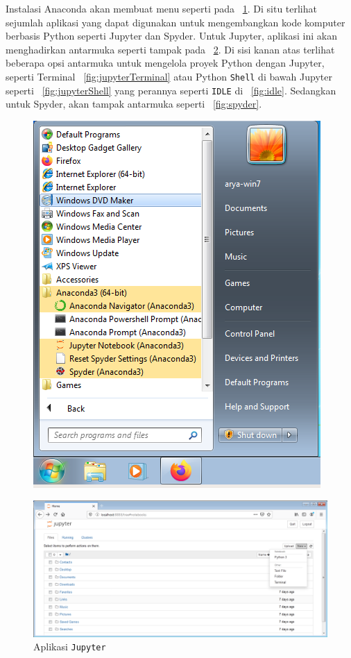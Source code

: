 Instalasi Anaconda akan membuat menu seperti pada \figurename~\ref{fig:menuAnaconda}. Di situ terlihat sejumlah aplikasi yang dapat digunakan untuk mengembangkan kode komputer berbasis Python seperti Jupyter dan Spyder. Untuk Jupyter, aplikasi ini akan menghadirkan antarmuka seperti tampak pada \figurename~\ref{fig:jupyter}. Di sisi kanan atas terlihat beberapa opsi antarmuka untuk mengelola proyek Python dengan Jupyter, seperti Terminal \figurename~\ref{fig:jupyterTerminal} atau Python \texttt{Shell} di bawah Jupyter seperti \figurename~\ref{fig:jupyterShell} yang perannya seperti \texttt{IDLE} di \figurename~\ref{fig:idle}. Sedangkan untuk Spyder, akan tampak antarmuka seperti \figurename~\ref{fig:spyder}.

\begin{figure}[h!]
  \begin{center}
    \includegraphics[scale=.5]{pics/anacondaMenu2.png}
    \caption{}
    \label{fig:menuAnaconda}
  \end{center}
\end{figure}

\begin{figure}[h!]
  \begin{center}
    \includegraphics[scale=.5]{pics/jupyter2.png}
    \caption{Aplikasi \texttt{Jupyter}}
    \label{fig:jupyter}
  \end{center}
\end{figure}

